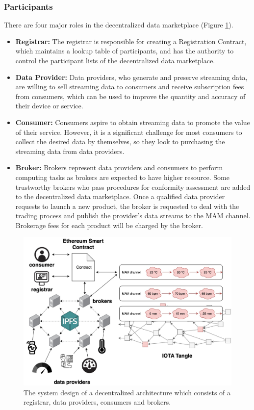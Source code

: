 \documentclass[journal,article,applsci,submit,moreauthors,pdftex]{Definitions/mdpi}
\begin{document}
\subsubsection{Participants}
There are four major roles in the decentralized data marketplace (Figure \ref{fig:system_design}).

\begin{itemize}[leftmargin=*,labelsep=5.8mm]
\item \textbf{Registrar: }
The registrar is responsible for creating a Registration Contract, which maintains a lookup table of participants, and has the authority to control the participant lists of the decentralized data marketplace.
\item \textbf{Data Provider: }
Data providers, who generate and preserve streaming data, are willing to sell streaming data to consumers and receive subscription fees from consumers, which can be used to improve the quantity and accuracy of their device or service.
\item \textbf{Consumer: }
Consumers aspire to obtain streaming data to promote the value of their service. However, it is a significant challenge for most consumers to collect the desired data by themselves, so they look to purchasing the streaming data from data providers.
\item \textbf{Broker: }
Brokers represent data providers and consumers to perform computing tasks as brokers are expected to have higher resource. Some trustworthy brokers who pass procedures for conformity assessment are added to the decentralized data marketplace. Once a qualified data provider requests to launch a new product, the broker is requested to deal with the trading process and publish the provider’s data streams to the MAM channel. Brokerage fees for each product will be charged by the broker.
\end{itemize}

\begin{figure}[h]
    \centering
    \includegraphics[width=3.3 in]{system_design}
    \caption{The system design of a decentralized architecture which consists of a registrar, data providers, consumers and brokers.}
    \label{fig:system_design}
\end{figure}
\end{document}
